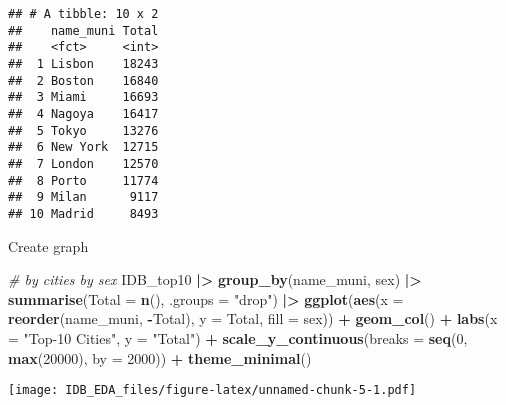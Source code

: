 \documentclass[
]{article}
\newenvironment{Shaded}{\begin{snugshade}}{\end{snugshade}}
\newcommand{\AttributeTok}[1]{\textcolor[rgb]{0.13,0.29,0.53}{#1}}
\newcommand{\CommentTok}[1]{\textcolor[rgb]{0.56,0.35,0.01}{\textit{#1}}}
\newcommand{\DecValTok}[1]{\textcolor[rgb]{0.00,0.00,0.81}{#1}}
\newcommand{\FunctionTok}[1]{\textcolor[rgb]{0.13,0.29,0.53}{\textbf{#1}}}
\newcommand{\NormalTok}[1]{#1}
\newcommand{\SpecialCharTok}[1]{\textcolor[rgb]{0.81,0.36,0.00}{\textbf{#1}}}
\newcommand{\StringTok}[1]{\textcolor[rgb]{0.31,0.60,0.02}{#1}}
\begin{document}
\begin{verbatim}
## # A tibble: 10 x 2
##    name_muni Total
##    <fct>     <int>
##  1 Lisbon    18243
##  2 Boston    16840
##  3 Miami     16693
##  4 Nagoya    16417
##  5 Tokyo     13276
##  6 New York  12715
##  7 London    12570
##  8 Porto     11774
##  9 Milan      9117
## 10 Madrid     8493
\end{verbatim}

Create graph

\begin{Shaded}
\begin{Highlighting}[]
\CommentTok{\# by cities by sex}
\NormalTok{IDB\_top10 }\SpecialCharTok{|\textgreater{}}
  \FunctionTok{group\_by}\NormalTok{(name\_muni, sex) }\SpecialCharTok{|\textgreater{}}
  \FunctionTok{summarise}\NormalTok{(}\AttributeTok{Total =} \FunctionTok{n}\NormalTok{(), }\AttributeTok{.groups =} \StringTok{"drop"}\NormalTok{) }\SpecialCharTok{|\textgreater{}}
  \FunctionTok{ggplot}\NormalTok{(}\FunctionTok{aes}\NormalTok{(}\AttributeTok{x =} \FunctionTok{reorder}\NormalTok{(name\_muni, }\SpecialCharTok{{-}}\NormalTok{Total), }\AttributeTok{y =}\NormalTok{ Total, }\AttributeTok{fill =}\NormalTok{ sex)) }\SpecialCharTok{+}
  \FunctionTok{geom\_col}\NormalTok{() }\SpecialCharTok{+}
  \FunctionTok{labs}\NormalTok{(}\AttributeTok{x =} \StringTok{"Top{-}10 Cities"}\NormalTok{, }\AttributeTok{y =} \StringTok{"Total"}\NormalTok{) }\SpecialCharTok{+}
  \FunctionTok{scale\_y\_continuous}\NormalTok{(}\AttributeTok{breaks =} \FunctionTok{seq}\NormalTok{(}\DecValTok{0}\NormalTok{, }\FunctionTok{max}\NormalTok{(}\DecValTok{20000}\NormalTok{), }\AttributeTok{by =} \DecValTok{2000}\NormalTok{)) }\SpecialCharTok{+}
  \FunctionTok{theme\_minimal}\NormalTok{()}
\end{Highlighting}
\end{Shaded}

\texttt{[image: IDB\_EDA\_files/figure-latex/unnamed-chunk-5-1.pdf]}
\end{document}
